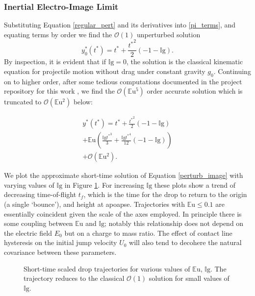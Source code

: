 \documentclass[aip,reprint, floatfix]{revtex4-1}
\begin{document}
\subsubsection{Inertial Electro-Image Limit}
Substituting Equation \ref{regular_pert} and its derivatives into \ref{pi_terms}, and equating terms by order we find the $\mathcal{O}(1)$ unperturbed solution
\[{y^*_{0}}{\left ({t^*} \right )} = {t^*} + \frac{{t^*}^{2}}{2} \left(-1 - \mathbb{I}\mbox{g}\right). \]
By inspection, it is evident that if $\mathbb{I}\mbox{g}=0$, the solution is the classical kinematic equation for projectile motion without drag under constant gravity $g_0$. Continuing on to higher order, after some tedious computations documented in the project repository for this work \cite{schmidt_droplet_electro-bounce:_2017}, we find the $\mathcal{O}(\mathbb{E}\mbox{u}^5)$ order accurate solution which is truncated to $\mathcal{O}(\mathbb{E}\mbox{u}^2)$ below:

\begin{gather}
{y^*}({t^*}) = {t^*} + \frac{{t^*}^{2}}{2} \left(-1 - \mathbb{I}\mbox{g}\right) \nonumber \\
 + \mathbb{E}\mbox{u} \left(\frac{\mathbb{I}\mbox{g} {t^*}^{3}}{3} + \frac{\mathbb{I}\mbox{g} {t^*}^{4}}{12} \left(-1 - \mathbb{I}\mbox{g} \right)\right) \nonumber \\
 + \mathcal{O}(\mathbb{E}\mbox{u}^2). \label{perturb_image}
\end{gather}

We plot the approximate short-time solution of Equation \ref{perturb_image} with varying values of $\mathbb{I}\mbox{g}$ in Figure \ref{fig:short_times}. For increasing $\mathbb{I}\mbox{g}$ these plots show a trend of decreasing time-of-flight $t_f$, which is the time for the drop to return to the origin (a single `bounce'), and height at apoapse. Trajectories with $\mathbb{E}\mbox{u} \leq 0.1$ are essentially coincident given the scale of the axes employed. In principle there is some coupling between $\mathbb{E}\mbox{u}$ and $\mathbb{I}\mbox{g}$; notably this relationship does not depend on the electric field $E_0$ but on a charge to mass ratio. The effect of contact line hysteresis on the initial jump velocity $U_0$ will also tend to decohere the natural covariance between these parameters.

\begin{figure}[htp]
    \resizebox{0.8\textwidth}{!}{}
    \caption{Short-time scaled drop trajectories for various values of $\mathbb{E}\mbox{u}$, $\mathbb{I}\mbox{g}$. The trajectory reduces to the classical $\mathcal{O}(1)$ solution for small values of $\mathbb{I}\mbox{g}$.}
    \label{fig:short_times}
\end{figure}
\end{document}
